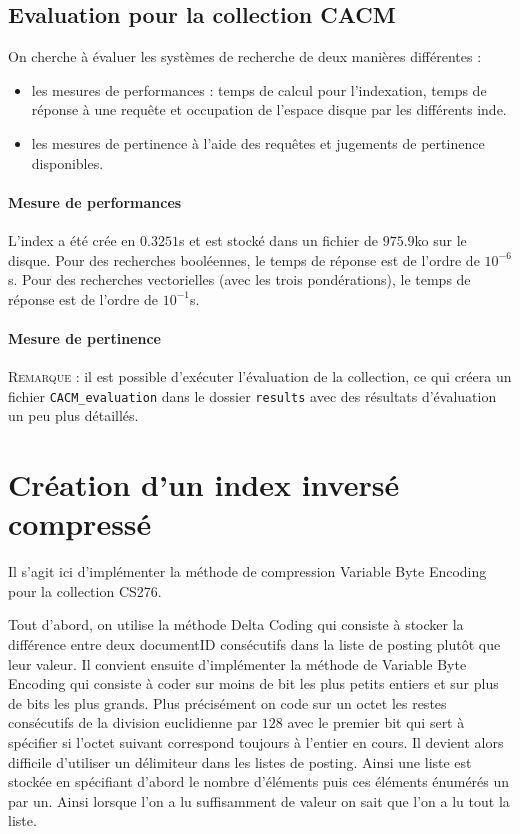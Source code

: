 \documentclass[12pt,a4paper]{article}
\begin{document}
\subsection{Evaluation pour la collection CACM}

On cherche à évaluer les systèmes de recherche de deux manières différentes :
\begin{itemize}
\item les mesures de performances : temps de calcul pour l’indexation, temps de réponse à une requête et occupation de l’espace disque par les différents inde.
\item les mesures de pertinence à l'aide des requêtes et jugements de pertinence disponibles.
\end{itemize}

\paragraph{Mesure de performances} L'index a été crée en $0.3251$s et est stocké dans un fichier de $975.9$ko sur le disque.
Pour des recherches booléennes, le temps de réponse est de l'ordre de $10^{-6}$s.
Pour des recherches vectorielles (avec les trois pondérations), le temps de réponse est de l'ordre de $10^{-1}$s.

\paragraph{Mesure de pertinence}

\noindent \textsc{Remarque} : il est possible d'exécuter l'évaluation de la collection, ce qui créera un fichier \texttt{CACM\_evaluation} dans le dossier \texttt{results} avec des résultats d'évaluation un peu plus détaillés.

\section{Création d’un index inversé compressé}
Il s'agit ici d'implémenter la méthode de compression Variable Byte Encoding pour la collection CS276.

Tout d'abord, on utilise la méthode Delta Coding qui consiste à stocker la différence entre deux documentID consécutifs dans la liste de posting plutôt que leur valeur. Il convient ensuite d'implémenter la méthode de Variable Byte Encoding qui consiste à coder sur moins de bit les plus petits entiers et sur plus de bits les plus grands. Plus précisément on code sur un octet les restes consécutifs de la division euclidienne par $128$ avec le premier bit qui sert à spécifier si l'octet suivant correspond toujours à l'entier en cours. Il devient alors difficile d'utiliser un délimiteur dans les listes de posting. Ainsi une liste est stockée en spécifiant d'abord le nombre d'éléments puis ces éléments énumérés un par un. Ainsi lorsque l'on a lu suffisamment de valeur on sait que l'on a lu tout la liste.
\end{document}
